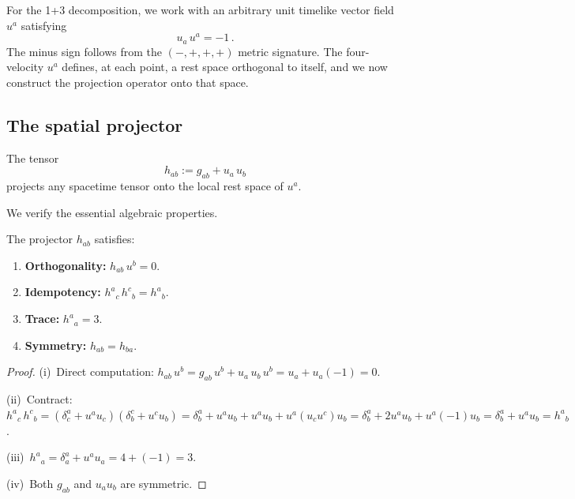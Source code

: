 For the 1+3 decomposition, we work with an arbitrary unit
timelike vector field $u^a$ satisfying
\begin{equation}\label{eq:u-norm}
u_a\, u^a = -1\,.
\end{equation}
The minus sign follows from the $(-,+,+,+)$ metric signature.
The four-velocity $u^a$ defines, at each point, a rest space
orthogonal to itself, and we now construct the projection
operator onto that space.


\subsection{The spatial projector}\label{sec:projector}

\begin{definition}\label{def:hab}
The tensor
\begin{equation}\label{eq:hab-def}
h_{ab} := g_{ab} + u_a\, u_b
\end{equation}
projects any spacetime tensor onto the local rest space of $u^a$.
\end{definition}

We verify the essential algebraic properties.

\begin{proposition}[Properties of $h_{ab}$]
\label{prop:hab-properties}
The projector $h_{ab}$ satisfies:
\begin{enumerate}
\item[\emph{(i)}] \textbf{Orthogonality:} $h_{ab}\,u^b = 0$.
\item[\emph{(ii)}] \textbf{Idempotency:}
  $h^a{}_c\,h^c{}_b = h^a{}_b$.
\item[\emph{(iii)}] \textbf{Trace:} $h^a{}_a = 3$.
\item[\emph{(iv)}] \textbf{Symmetry:} $h_{ab} = h_{ba}$.
\end{enumerate}
\end{proposition}

\begin{proof}
(i)~Direct computation:
$h_{ab}\,u^b = g_{ab}\,u^b + u_a\,u_b\,u^b
= u_a + u_a(-1) = 0$.

(ii)~Contract:
$h^a{}_c\,h^c{}_b
= (\delta^a_c + u^a u_c)(\delta^c_b + u^c u_b)
= \delta^a_b + u^a u_b + u^a u_b + u^a(u_c u^c)u_b
= \delta^a_b + 2u^a u_b + u^a(-1)u_b
= \delta^a_b + u^a u_b = h^a{}_b$.

(iii)~$h^a{}_a = \delta^a_a + u^a u_a = 4 + (-1) = 3$.

(iv)~Both $g_{ab}$ and $u_a u_b$ are symmetric.
\end{proof}

